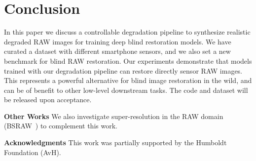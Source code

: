 \documentclass{article}
\begin{document}
\section{Conclusion}
\label{sec:conclusion}

In this paper we discuss a controllable degradation pipeline to synthesize realistic degraded RAW images for training deep blind restoration models.
%
We have curated a dataset with different smartphone sensors, and we also set a new benchmark for blind RAW restoration. 
%
Our experiments demonstrate that models trained with our degradation pipeline can restore directly sensor RAW images. This represents a powerful alternative for blind image restoration in the wild, and can be of benefit to other low-level downstream tasks. The code and dataset will be released upon acceptance.

\vspace{2mm}
\noindent\textbf{Other Works} We also investigate super-resolution in the RAW domain (BSRAW~\cite{conde2024bsraw}) to complement this work.

\vspace{2mm}
\noindent\textbf{Acknowledgments} This work was partially supported by the Humboldt Foundation (AvH).


\end{document}

